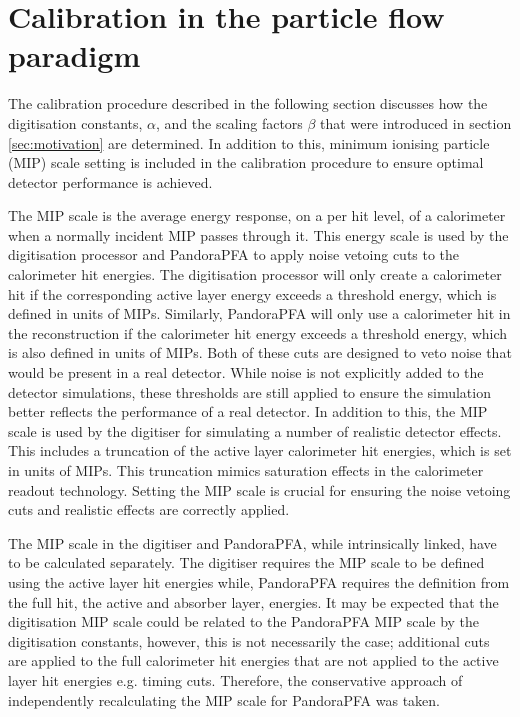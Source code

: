 \section{Calibration in the particle flow paradigm}
\label{sec:overviewcalibration}
The calibration procedure described in the following section discusses how the digitisation constants, $\alpha$, and the scaling factors $\beta$ that were introduced in section \ref{sec:motivation} are determined.  In addition to this, minimum ionising particle (MIP) scale setting is included in the calibration procedure to ensure optimal detector performance is achieved.  

The MIP scale is the average energy response, on a per hit level, of a calorimeter when a normally incident MIP passes through it.  This energy scale is used by the digitisation processor and PandoraPFA to apply noise vetoing cuts to the calorimeter hit energies.  The digitisation processor will only create a calorimeter hit if the corresponding active layer energy exceeds a threshold energy, which is defined in units of MIPs.  Similarly, PandoraPFA will only use a calorimeter hit in the reconstruction if the calorimeter hit energy exceeds a threshold energy, which is also defined in units of MIPs.  Both of these cuts are designed to veto noise that would be present in a real detector.  While noise is not explicitly added to the detector simulations, these thresholds are still applied to ensure the simulation better reflects the performance of a real detector.  In addition to this, the MIP scale is used by the digitiser for simulating a number of realistic detector effects.  This includes a truncation of the active layer calorimeter hit energies, which is set in units of MIPs.  This truncation mimics saturation effects in the calorimeter readout technology.  Setting the MIP scale is crucial for ensuring the noise vetoing cuts and realistic effects are correctly applied.
 
The MIP scale in the digitiser and PandoraPFA, while intrinsically linked, have to be calculated separately.  The digitiser requires the MIP scale to be defined using the active layer hit energies while, PandoraPFA requires the definition from the full hit, the active and absorber layer, energies.  It may be expected that the digitisation MIP scale could be related to the PandoraPFA MIP scale by the digitisation constants, however, this is not necessarily the case; additional cuts are applied to the full calorimeter hit energies that are not applied to the active layer hit energies e.g. timing cuts.  Therefore, the conservative approach of independently recalculating the MIP scale for PandoraPFA was taken.   

